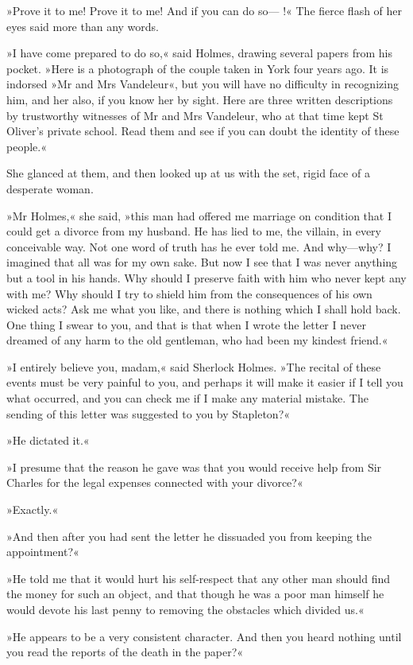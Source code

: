 »Prove it to me! Prove it to me! And if you can do so— !« The fierce flash of her eyes said more than any words.

»I have come prepared to do so,« said Holmes, drawing several papers from his pocket. »Here is a photograph of the couple taken in York four years ago. It is indorsed »Mr and Mrs Vandeleur«, but you will have no difficulty in recognizing him, and her also, if you know her by sight. Here are three written descriptions by trustworthy witnesses of Mr and Mrs Vandeleur, who at that time kept St Oliver's private school. Read them and see if you can doubt the identity of these people.«

She glanced at them, and then looked up at us with the set, rigid face of a desperate woman.

»Mr Holmes,« she said, »this man had offered me marriage on condition that I could get a divorce from my husband. He has lied to me, the villain, in every conceivable way. Not one word of truth has he ever told me. And why—why? I imagined that all was for my own sake. But now I see that I was never anything but a tool in his hands. Why should I preserve faith with him who never kept any with me? Why should I try to shield him from the consequences of his own wicked acts? Ask me what you like, and there is nothing which I shall hold back. One thing I swear to you, and that is that when I wrote the letter I never dreamed of any harm to the old gentleman, who had been my kindest friend.«

»I entirely believe you, madam,« said Sherlock Holmes. »The recital of these events must be very painful to you, and perhaps it will make it easier if I tell you what occurred, and you can check me if I make any material mistake. The sending of this letter was suggested to you by Stapleton?«

»He dictated it.«

»I presume that the reason he gave was that you would receive help from Sir Charles for the legal expenses connected with your divorce?«

»Exactly.«

»And then after you had sent the letter he dissuaded you from keeping the appointment?«

»He told me that it would hurt his self-respect that any other man should find the money for such an object, and that though he was a poor man himself he would devote his last penny to removing the obstacles which divided us.«

»He appears to be a very consistent character. And then you heard nothing until you read the reports of the death in the paper?«

